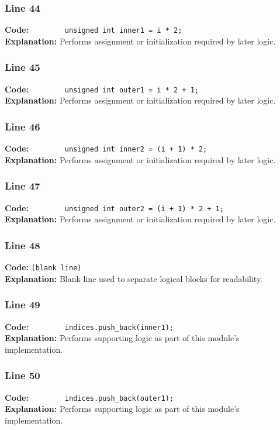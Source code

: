 \documentclass[11pt,a4paper]{article}
\begin{document}
\subsubsection*{Line 44}
\textbf{Code:} \verb|        unsigned int inner1 = i * 2;|\\
\textbf{Explanation:} Performs assignment or initialization required by later logic.

\subsubsection*{Line 45}
\textbf{Code:} \verb|        unsigned int outer1 = i * 2 + 1;|\\
\textbf{Explanation:} Performs assignment or initialization required by later logic.

\subsubsection*{Line 46}
\textbf{Code:} \verb|        unsigned int inner2 = (i + 1) * 2;|\\
\textbf{Explanation:} Performs assignment or initialization required by later logic.

\subsubsection*{Line 47}
\textbf{Code:} \verb|        unsigned int outer2 = (i + 1) * 2 + 1;|\\
\textbf{Explanation:} Performs assignment or initialization required by later logic.

\subsubsection*{Line 48}
\textbf{Code:} \texttt{(blank line)}\\
\textbf{Explanation:} Blank line used to separate logical blocks for readability.

\subsubsection*{Line 49}
\textbf{Code:} \verb|        indices.push_back(inner1);|\\
\textbf{Explanation:} Performs supporting logic as part of this module's implementation.

\subsubsection*{Line 50}
\textbf{Code:} \verb|        indices.push_back(outer1);|\\
\textbf{Explanation:} Performs supporting logic as part of this module's implementation.
\end{document}
